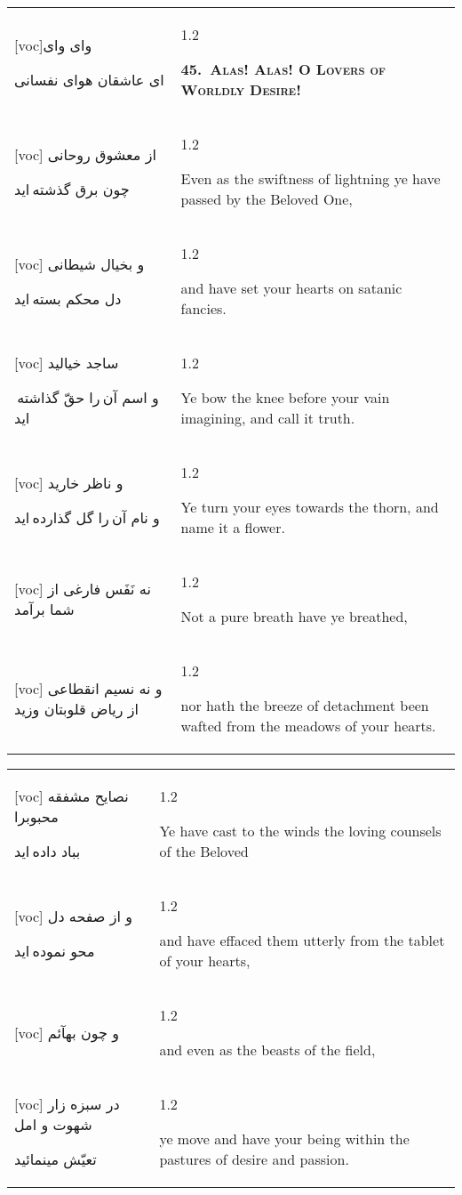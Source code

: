 \documentclass[11pt]{article}
\makeatletter
\newenvironment{orig}
  {\begin{farsi}[voc]}
  {\end{farsi}}
\newenvironment{trans}
  {\Large\begin{spacing}{1.2}\raggedright}
  {\end{spacing}}
\newenvironment{word}
  {\begin{tabular}[t]{p{2.75in}@{\hspace{3em}}p{2.875in}}}
  {\end{tabular}}
\newcommand{\ayat}[2]{\begin{orig}#1\end{orig} & \begin{trans}#2\end{trans}}
\newcommand{\heading}[2]{\textsc{\textbf{#1}} %
}
\makeatother
\begin{document}
\pagebreak

\begin{word}
\ayat{وای وای

ای عاشقان هوای نفسانی}{\heading{45.~Alas!  Alas!  O Lovers of Worldly Desire!}{}} \\ \ayat{
از معشوق روحانی

چون برق گذشته ايد
}{Even as the swiftness of lightning ye have passed by the Beloved
  One,} \\ \ayat{
و بخيال شيطانی

دل محکم بسته ايد
}{and have set your hearts on satanic fancies.} \\ \ayat{
ساجد خياليد

و اسم آن را حقّ گذاشته ايد
}{Ye bow the knee before your vain imagining, and call it truth.} \\ \ayat{
و ناظر خاريد

و نام آن را گل گذارده ايد
}{Ye turn your eyes towards the thorn, and name it a flower.} \\ \ayat{
نه نَفَس فارغی از شما برآمد
}{Not a pure breath have ye breathed,} \vspace{-1ex}\\ \ayat{
و نه نسيم انقطاعی از رياض قلوبتان وزيد
}{nor hath the breeze of detachment been wafted from the meadows of your
  hearts.}
\end{word}

\pagebreak

\begin{word}
\ayat{
نصايح مشفقه محبوبرا

بباد داده ايد
}{Ye have cast to the winds the loving counsels of the Beloved} \vspace{-1ex}\\ \ayat{
و از صفحه دل

محو نموده ايد
}{and have effaced them utterly from the tablet of your hearts,} \vspace{-1ex}\\ \ayat{
و چون بهآئم
}{and even as the beasts of the field,} \vspace{-1ex}\\ \ayat{
در سبزه زار شهوت و امل

تعيّش مينمائيد
}{ye move and have your being within the pastures of desire and passion.}
\end{word}

\pagebreak
\end{document}
